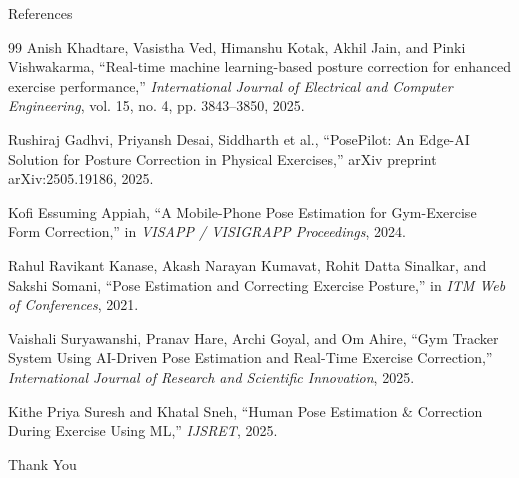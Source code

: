 \documentclass[aspectratio=169]{beamer}
\begin{document}
\begin{frame}[allowframebreaks]{References}
\footnotesize
\begin{thebibliography}{99}
Anish Khadtare, Vasistha Ved, Himanshu Kotak, Akhil Jain, and Pinki Vishwakarma,
\newblock ``Real-time machine learning-based posture correction for enhanced exercise performance,''
\newblock \emph{International Journal of Electrical and Computer Engineering}, vol. 15, no. 4, pp. 3843--3850, 2025.

Rushiraj Gadhvi, Priyansh Desai, Siddharth et al.,
\newblock ``PosePilot: An Edge-AI Solution for Posture Correction in Physical Exercises,''
\newblock arXiv preprint arXiv:2505.19186, 2025.

Kofi Essuming Appiah,
\newblock ``A Mobile-Phone Pose Estimation for Gym-Exercise Form Correction,''
\newblock in \emph{VISAPP / VISIGRAPP Proceedings}, 2024.

Rahul Ravikant Kanase, Akash Narayan Kumavat, Rohit Datta Sinalkar, and Sakshi Somani,
\newblock ``Pose Estimation and Correcting Exercise Posture,''
\newblock in \emph{ITM Web of Conferences}, 2021.

Vaishali Suryawanshi, Pranav Hare, Archi Goyal, and Om Ahire,
\newblock ``Gym Tracker System Using AI-Driven Pose Estimation and Real-Time Exercise Correction,''
\newblock \emph{International Journal of Research and Scientific Innovation}, 2025.

Kithe Priya Suresh and Khatal Sneh,
\newblock ``Human Pose Estimation \& Correction During Exercise Using ML,''
\newblock \emph{IJSRET}, 2025.
\end{thebibliography}
\end{frame}

\begin{frame}
  \centering
  \Huge Thank You
\end{frame}
\end{document}
